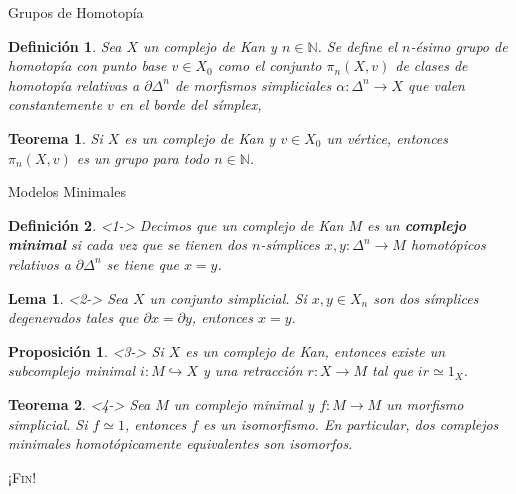 \documentclass[11pt]{beamer}
\newcommand{\N}{\mathbb{N}}
\renewcommand{\ss}[1]{\Delta^{#1}}
\newtheorem{defs}{Definición}
\newtheorem{teo}{Teorema}
\newtheorem{prop}{Proposición}
\newtheorem{lema}{Lema}
\begin{document}
\begin{frame}{Grupos de Homotopía} 

\begin{defs} Sea $X$ un complejo de Kan y $n \in \N$. Se define el $n$-ésimo grupo de homotopía con punto base $v \in X_0$ como el conjunto $\pi_n(X,v)$ de clases de homotopía relativas a $\partial \ss{n}$ de morfismos simpliciales $\alpha : \ss{n} \to X$ que valen constantemente $v$ en el borde del símplex,
\begin{center}
\end{center}
\end{defs}
\begin{teo} Si $X$ es un complejo de Kan y $v \in X_0$ un vértice, entonces $\pi_n(X,v)$ es un grupo para todo $n \in \N$.
\end{teo}
\end{frame}

\begin{frame}{Modelos Minimales}

\begin{defs} <1-> Decimos que un complejo de Kan $M$ es un \textbf{complejo minimal} si cada vez que se tienen dos $n$-símplices $x,y \colon \ss{n} \to M$  homotópicos relativos a $\partial \ss{n}$ se tiene que $x = y$.
\end{defs}

\begin{lema} <2-> Sea $X$ un conjunto simplicial. Si $x,y \in X_n$ son dos símplices degenerados tales que $\partial x = \partial y$, entonces $x = y$. 
\end{lema}

\begin{prop} <3-> Si $X$ es un complejo de Kan, entonces existe un subcomplejo minimal $i : M \hookrightarrow X$ y una retracción $r : X \to M$ tal que $ir \simeq 1_X$. 
\end{prop}

\begin{teo} <4-> Sea $M$ un complejo minimal y $f : M \to M$ un morfismo simplicial. Si $f \simeq 1$, entonces $f$ es un isomorfismo. En particular, dos complejos minimales homotópicamente equivalentes son isomorfos.
\end{teo}
\end{frame}
\begin{frame}
\begin{center}
\scshape \LARGE ¡Fin!
\end{center}
\end{frame}
\end{document}

